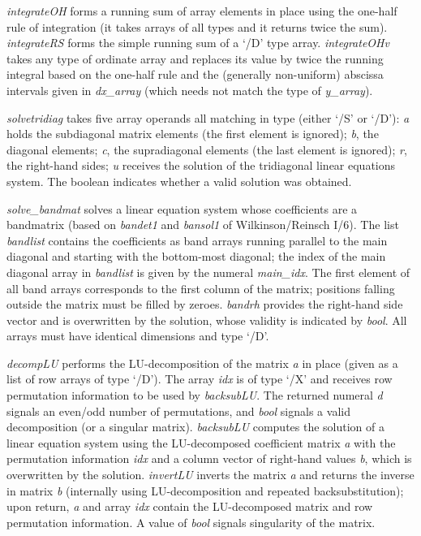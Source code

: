 \emph{integrateOH} forms a running sum of array elements in place using the one-half rule of integration (it takes arrays of all types and it returns twice the sum). \emph{integrateRS} forms the simple running sum of a `/D' type array. \emph{integrateOHv} takes any type of ordinate array and replaces its value by twice the running integral based on the one-half rule and the (generally non-uniform) abscissa intervals given in \emph{dx\_array} (which needs not match the type of \emph{y\_array}).

\emph{solvetridiag} takes five array operands all matching in type (either `/S' or `/D'): \emph{a} holds the subdiagonal matrix elements (the first element is ignored); \emph{b}, the diagonal elements; \emph{c}, the supradiagonal elements (the last element is ignored); \emph{r}, the right-hand sides; \emph{u} receives the solution of the tridiagonal linear equations system. The boolean indicates whether a valid solution was obtained.

\emph{solve\_bandmat} solves a linear equation system whose coefficients are a bandmatrix (based on \emph{bandet1} and \emph{bansol1} of Wilkinson/Reinsch I/6). The list \emph{bandlist} contains the coefficients as band arrays running parallel to the main diagonal and starting with the bottom-most diagonal; the index of the main diagonal array in \emph{bandlist} is given by the numeral \emph{main\_idx}. The first element of all band arrays corresponds to the first column of the matrix; positions falling outside the matrix must be filled by zeroes. \emph{bandrh} provides the right-hand side vector and is overwritten by the solution, whose validity is indicated by \emph{bool}. All arrays must have identical dimensions and type `/D'.

\emph{decompLU} performs the LU-decomposition of the matrix \emph{a} in place (given as a list of row arrays of type `/D'). The array \emph{idx} is of type `/X' and receives row permutation information to be used by \emph{backsubLU}. The returned numeral \emph{d} signals an even/odd number of permutations, and \emph{bool} signals a valid decomposition (or a singular matrix). \emph{backsubLU} computes the solution of a linear equation system using the LU-decomposed coefficient matrix \emph{a} with the permutation information \emph{idx} and a column vector of right-hand values \emph{b}, which is overwritten by the solution. \emph{invertLU} inverts the matrix \emph{a} and returns the inverse in matrix \emph{b} (internally using LU-decomposition and repeated backsubstitution); upon return, \emph{a} and array \emph{idx} contain the LU-decomposed matrix and row permutation information. A  value of \emph{bool} signals singularity of the matrix.

